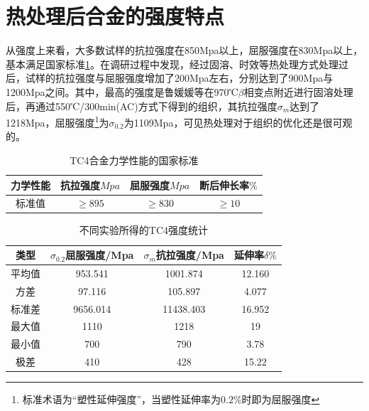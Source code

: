 \documentclass[
class = book,
zihao = -4,
font = noto,
paper = a4paper,
openany
]{easybook}
\begin{document}
\section{热处理后合金的强度特点}
从强度上来看，大多数试样的抗拉强度在850Mpa以上，屈服强度在830Mpa以上，基本满足国家标准\ref{sec:mytc4machin}。在调研过程中发现，经过固溶、时效等热处理方式处理过后，试样的抗拉强度与屈服强度增加了200Mpa左右，分别达到了900Mpa与1200Mpa之间。其中，最高的强度是鲁媛媛等\cite{LuYuanYuanShiXiaoChuLiDuiTC4TaiHeJinWeiGuanZuZhiHeLiXueXingNengDeYingXiang2019}在970℃$ \beta $相变点附近进行固溶处理后，再通过550℃/300min(AC)方式下得到的组织，其抗拉强度$ \sigma_m $达到了1218Mpa，屈服强度\footnote{标准术语为“塑性延伸强度”，当塑性延伸率为$0.2\%  $时即为屈服强度}为$ \sigma_{0.2} $为1109Mpa，可见热处理对于组织的优化还是很可观的。
\begin{table}[htbp]
	\centering
	\caption{TC4合金力学性能的国家标准}
	\label{sec:mytc4machin}
	\begin{tabular}{cccc}
		\toprule
		力学性能& 抗拉强度$Mpa  $& 屈服强度$ Mpa $&断后伸长率$ \% $\\ \midrule
		标准值 &$ \ge 895 $&$ \ge 830 $&$ \ge 10 $ \\ \bottomrule
	\end{tabular}
\end{table}


\begin{table}[htbp]
	\centering
	\caption{不同实验所得的TC4强度统计}
	\label{sec:mytcstrengthave}
	\begin{tabular}{cccc}
		\toprule
		类型& $ \sigma_{0.2} $屈服强度/Mpa  &$ \sigma_m $抗拉强度/Mpa &延伸率$ \delta \% $ \\ \midrule
		平均值 & 953.541& 1001.874&12.160 \\
		方差 &97.116& 105.897& 4.077 \\
		标准差 &9656.014&11438.403&16.952 \\
		最大值 &  1110 & 1218 & 19 \\
		最小值&700 & 790 & 3.78 \\
		极差&410 & 428 & 15.22 \\
		\bottomrule
	\end{tabular}
\end{table}


\end{document}
